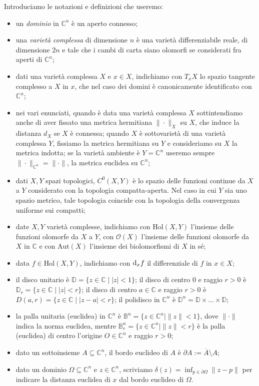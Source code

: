 Introduciamo le notazioni e definizioni che useremo:
\begin{itemize}
    \item  un \textit{dominio} in $\mathbb{C}^n$ è un aperto connesso;
    \item una \textit{varietà complessa} di dimensione $n$ è una varietà differenziabile reale, di dimensione $2n$ e tale che i cambi di carta siano olomorfi se considerati fra aperti di $\mathbb{C}^n$;
    \item dati una varietà complessa $X$ e $x \in X$, indichiamo con $T_xX$ lo spazio tangente complesso a $X$ in $x$, che nel caso dei domini è canonicamente identificato con $\mathbb{C}^n$;
    \item nei vari enunciati, quando è data una varietà complessa $X$ sottintendiamo anche di aver fissato una metrica hermitiana $\|\cdot\|_X$ su $X$, che induce la distanza $d_X$ se $X$ è connessa; quando $X$ è sottovarietà di una varietà complessa $Y$, fissiamo la metrica hermitiana su $Y$ e consideriamo su $X$ la metrica indotta; se la varietà ambiente è $Y=\mathbb{C}^n$ useremo sempre $\|\cdot\|_{\mathbb{C}^n}=\|\cdot\|$, la metrica euclidea su $\mathbb{C}^n$;
    \item dati $X,Y$ spazi topologici, $C^0(X,Y)$ è lo spazio delle funzioni continue da $X$ a $Y$ considerato con la topologia compatta-aperta. Nel caso in cui $Y$ sia uno spazio metrico, tale topologia coincide con la topologia della convergenza uniforme sui compatti;
    \item date $X,Y$ varietà complesse, indichiamo con $\text{Hol}(X,Y)$ l'insieme delle funzioni olomorfe da $X$ a $Y$, con $\mathcal{O}(X)$ l'insieme delle funzioni olomorfe da $X$ in $\mathbb{C}$ e con $\text{Aut}(X)$ l'insieme dei biolomorfismi di $X$ in sé;
    \item data $f \in \text{Hol}(X,Y)$, indichiamo con $\mathop{}\!\mathrm{d}_x f$ il differenziale di $f$ in $x \in X$;
    \item il disco unitario è $\mathbb{D}=\{z \in \mathbb{C} \mid |z|<1\}$; il disco di centro $0$ e raggio $r>0$ è $\mathbb{D}_r=\{z \in \mathbb{C} \mid |z|<r\}$; il disco di centro $a\in\mathbb{C}$ e raggio $r>0$ è $D(a,r)=\{z\in\mathbb{C}\mid |z-a|<r\}$; il polidisco in $\mathbb{C}^n$ è $\mathbb{D}^n=\mathbb{D}\times\dots\times\mathbb{D}$;
    \item la palla unitaria (euclidea) in $\mathbb{C}^n$ è $\mathbb{B}^n=\{z \in \mathbb{C}^n \mid \|z\|<1\}$, dove $\|\cdot\|$ indica la norma euclidea, mentre $\mathbb{B}_r^n=\{z \in \mathbb{C}^n \mid \|z\|<r\}$ è la palla (euclidea) di centro l'origine $O\in\mathbb{C}^n$ e raggio $r>0$;
    \item dato un sottoinsieme $A\subseteq \mathbb{C}^n$, il bordo euclideo di $A$ è $\partial A:=\overline{A}\setminus A$;
    \item dato un dominio $\Omega\subseteq\mathbb{C}^n$ e $z \in \mathbb{C}^n$, scriviamo $\delta(z)=\displaystyle\inf_{p \in \partial\Omega}\|z-p\|$ per indicare la distanza euclidea di $x$ dal bordo euclideo di $\Omega$.
\end{itemize}

